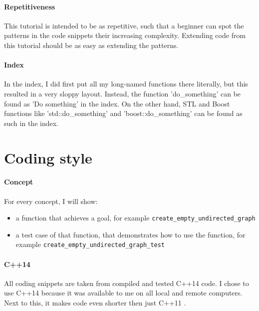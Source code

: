 \paragraph{Repetitiveness}

This tutorial is intended to be as repetitive, such that a beginner can
spot the patterns in the code snippets their increasing complexity.
Extending code from this tutorial should be as easy as extending the patterns.

\paragraph{Index}

In the index, I did first put all my long-named functions there literally,
but this resulted in a very sloppy layout.
Instead, the function 'do\_something' can be found as 'Do something' in
the index.
On the other hand, STL and Boost functions like 'std::do\_something' and
'boost::do\_something' can be found as such in the index.

\section{Coding style}

\paragraph{Concept}

For every concept, I will show:

\begin{itemize}
    \item a function that achieves a goal, 
      for example \verb;create_empty_undirected_graph;
    \item{
      a test case of that function, 
      that demonstrates how to use the function, for example
      \verb;create_empty_undirected_graph_test;
    }
\end{itemize}

\paragraph{C++14}

All coding snippets are taken from compiled and tested C++14 code.
I chose to use C++14 because it was available to me on all local and remote
computers.
Next to this, it makes code even shorter then just C++11 .

